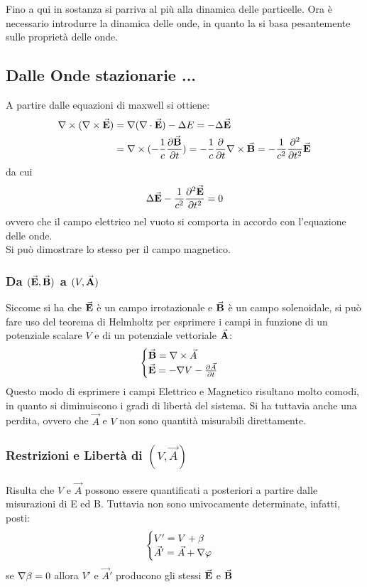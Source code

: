 Fino a qui in sostanza si parriva al più alla dinamica delle particelle. Ora è necessario introdurre la dinamica delle onde, in quanto la \MQ si basa pesantemente sulle proprietà delle onde.




\subsection{Dalle Onde stazionarie ...}
A partire dalle equazioni di maxwell si ottiene: 
\begin{align*}
	\nabla\times (\nabla\times\vec{\textbf{E}}) &= \nabla (\nabla\cdot\vec{\textbf{E}}) - \Delta E = - \Delta \vec{\textbf{E}}\\
	&= \nabla\times (- \frac{1}{c} \frac{\partial\vec{\textbf{B}}}{\partial t}) = - \frac{1}{c} \frac{\partial }{\partial t}\nabla\times\vec{\textbf{B}} =  - \frac{1}{c^2} \frac{\partial^2 }{\partial t^2} \vec{\textbf{E}}
\end{align*}
da cui
\[
	\Delta \vec{\textbf{E}} - \frac{1}{c^2} \frac{\partial^2\vec{\textbf{E}}}{\partial t^2} = 0
\]
ovvero che il campo elettrico nel vuoto si comporta in accordo con l'equazione delle onde.\\
Si può dimostrare lo stesso per il campo magnetico.

\subsubsection*{Da \texorpdfstring{$(\vec{\textbf{E}}, \vec{\textbf{B}})$}{} a \texorpdfstring{$(V, \vec{\textbf{A}})$}{} }
Siccome si ha che $\vec{\textbf{E}}$ è un campo irrotazionale e $\vec{\textbf{B}}$ è un campo solenoidale, si può fare uso del teorema di Helmholtz per esprimere i campi in funzione di un potenziale scalare $V$ e di un potenziale vettoriale $\vec{\textbf{A}}$:
\[
	\begin{cases}
		\vec{\textbf{B}} = \nabla\times\vec A \\
		\vec{\textbf{E}} = - \nabla V - \frac{\partial\vec A}{\partial t}
	\end{cases}
\]
Questo modo di esprimere i campi Elettrico e Magnetico risultano molto comodi, in quanto si diminuiscono i gradi di libertà del sistema. Si ha tuttavia anche una perdita, ovvero che $\vec A$ e $V$ non sono quantità misurabili direttamente.

\subsubsection*{Restrizioni e Libertà di \texorpdfstring{$(V, \vec A)$}{}}
Risulta che $V$ e $\vec A$ possono essere quantificati a posteriori a partire dalle misurazioni di \evect E ed \evect B. Tuttavia non sono univocamente determinate, infatti, posti:
\[
	\begin{cases}
		V' = V + \beta \\
		\vec A' = \vec A + \nabla \varphi
	\end{cases}
\]
se $\nabla \beta = 0$ allora $V'$ e $\vec A'$ producono gli stessi $\vec{\textbf{E}}$ e $\vec{\textbf{B}}$

